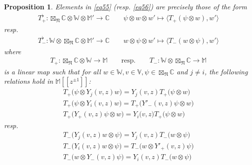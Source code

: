 \documentclass[11pt,b5paper,notitlepage]{article}
\theoremstyle{definition}
\theoremstyle{plain}
\newtheorem{pp}[df]{Proposition}
\newcommand{\Vbb}{\mathbb V}
\newcommand{\Wbb}{\mathbb W}
\newcommand{\Mbb}{\mathbb M}
\newcommand{\Cbb}{\mathbb C}
\newcommand{\<}{\left\langle}
\renewcommand{\>}{\right\rangle}
\newcommand{\bk}[1]{\langle {#1}\rangle}
\newcommand{\fn}{\mathfrak{N}}
\numberwithin{equation}{section}
\begin{document}
\begin{pp}\label{lb44}
Elements in \eqref{eq55} (resp. \eqref{eq56}) are precisely those of the form
\begin{gather*}
T_+^\flat:\boxtimes_\fn\Cbb\otimes\Wbb\otimes\Mbb'\rightarrow\Cbb\qquad \psi\otimes w\otimes w'\mapsto\bk{T_+(\psi\otimes w),w'}
\end{gather*}
resp.
\begin{gather*}
T_-^\flat:\Wbb\otimes\boxtimes_\fn\Cbb\otimes\Mbb'\rightarrow\Cbb\qquad w\otimes\psi\otimes w'\mapsto\bk{T_-(w\otimes\psi),w'}
\end{gather*}
where
\begin{align*}
T_+:\boxtimes_\fn\Cbb\otimes\Wbb\rightarrow\Mbb\qquad\text{resp.}\qquad T_-:\Wbb\otimes\boxtimes_\fn\Cbb\rightarrow\Mbb
\end{align*}
is a linear map such that for all $w\in\Wbb,v\in\Vbb,\psi\in\boxtimes_\fn\Cbb$ and $j\neq i$, the following relations hold in $\Mbb[[z^{\pm 1}]]$:
\begin{subequations}\label{eq118}
\begin{gather}
T_+\big(\psi\otimes Y_j(v,z)w\big)=Y_j(v,z)T_+\big(\psi\otimes w\big)\\
T_+\big(\psi\otimes Y_i(v,z)w\big)=T_+\big(Y'_-(v,z)\psi\otimes w\big)\\
T_+\big(Y_+(v,z)\psi\otimes w\big)=Y_i\big(v,z)T_+(\psi\otimes w\big)\label{eq118c}
\end{gather}
\end{subequations}
resp.
\begin{subequations}\label{eq119}
\begin{gather}
T_-\big(Y_j(v,z)w\otimes \psi\big)=Y_j(v,z)T_-\big(w\otimes\psi\big)\\
T_-\big(Y_i(v,z)w\otimes\psi\big)=T_-\big(w\otimes Y'_+(v,z)\psi\big)\\
T_-\big(w\otimes Y_-(v,z)\psi\big)=Y_i(v,z)T_-\big(w\otimes\psi\big)
\end{gather}
\end{subequations}
\end{pp}
\end{document}
